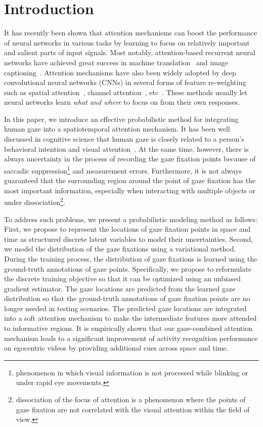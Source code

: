 \documentclass[10pt,twocolumn,letterpaper]{article}
\begin{document}
\section{Introduction} \label{sec:intro}
It has recently been shown that attention mechanisms can boost the performance of neural networks in various tasks by learning to focus on relatively important and salient parts of input signals. Most notably, attention-based recurrent neural networks have achieved great success in machine translation~\cite{bahdanau2014neural, luong2015effective} and image captioning~\cite{xu2015show}. Attention mechanisms have also been widely adopted by deep convolutional neural networks (CNNs) in several forms of feature re-weighting such as spatial attention~\cite{xu2016ask, oktay2018attention}, channel attention~\cite{hu2018squeeze, zhang2018image}, etc~\cite{woo2018cbam, suganuma2018attention}. These methods usually let neural networks learn \textit{what and where} to focus on from their own responses.

In this paper, we introduce an effective probabilistic method for integrating human gaze into a spatiotemporal attention mechanism. It has been well discussed in cognitive science that human gaze is closely related to a person's behavioral intention and visual attention~\cite{vickers2009advances, castiello2003understanding, frischen2007gaze, phillips2002infants}. At the same time, however, there is always uncertainty in the process of recording the gaze fixation points because of saccadic suppression\footnote{phenomenon in which visual information is not processed while blinking or under rapid eye movements.}\cite{krekelberg2010saccadic} and measurement errors. Furthermore, it is not always guaranteed that the surrounding region around the point of gaze fixation has the most important information, especially when interacting with multiple objects or under dissociation\footnote{dissociation of the focus of attention is a phenomenon where the points of gaze fixation are not correlated with the visual attention within the field of view.}\cite{brefczynski1999physiological, juan2004dissociation}.

To address such problems, we present a probabilistic modeling method as follows: First, we propose to represent the locations of gaze fixation points in space and time as structured discrete latent variables to model their uncertainties. Second, we model the distribution of the gaze fixations using a variational method. During the training process, the distribution of gaze fixations is learned using the ground-truth annotations of gaze points. Specifically, we propose to reformulate the discrete training objective so that it can be optimized using an unbiased gradient estimator. The gaze locations are predicted from the learned gaze distribution so that the ground-truth annotations of gaze fixation points are no longer needed in testing scenarios. The predicted gaze locations are integrated into a soft attention mechanism to make the intermediate features more attended to informative regions. It is empirically shown that our gaze-combined attention mechanism leads to a significant improvement of activity recognition performance on egocentric videos by providing additional cues across space and time.
\end{document}

